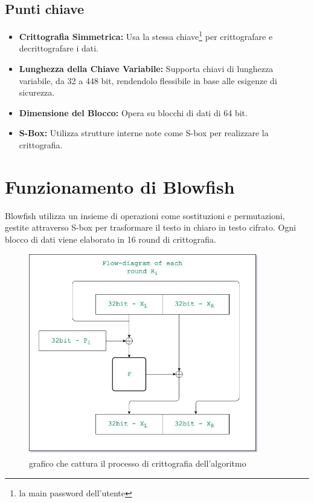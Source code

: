 \documentclass[a4paper,12pt]{report}
\begin{document}
		\subsection*{Punti chiave}
		\begin{itemize}
			\item \textbf{Crittografia Simmetrica:} Usa la stessa chiave\footnote{ la main password dell'utente} per
			crittografare e decrittografare i dati.
			\item \textbf{Lunghezza della Chiave Variabile:} Supporta chiavi di
			lunghezza variabile, da 32 a 448 bit, rendendolo flessibile in base alle
			esigenze di sicurezza.
			\item \textbf{Dimensione del Blocco:} Opera su blocchi di dati di 64
			bit.
			\item \textbf{S-Box:} Utilizza strutture interne note come
			S-box per realizzare la crittografia.
		\end{itemize}
		\newpage
		\section{Funzionamento di Blowfish}

		Blowfish utilizza un insieme di operazioni come sostituzioni e permutazioni,
		gestite attraverso S-box per trasformare il testo in chiaro in
		testo cifrato. Ogni blocco di dati viene elaborato in 16 round di
		crittografia.
		\begin{figure}[H]
			\centering
			\includegraphics[width=0.9\textwidth]{encription.jpg}
			\caption{grafico che cattura il processo di crittografia dell'algoritmo \cite{blowfish-algorithm}}
			\label{fig:encription}
		\end{figure}
\end{document}
